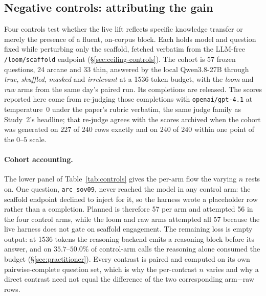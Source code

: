 \documentclass[10pt,twocolumn]{article}
\begin{document}
\subsection{Negative controls: attributing the gain}\label{sec:controls}
Four controls test whether the live lift reflects specific knowledge transfer or merely the presence of a fluent, on-corpus block. Each holds model and question fixed while perturbing only the scaffold, fetched verbatim from the LLM-free \texttt{/loom/scaffold} endpoint (\S\ref{sec:ceiling-controls}). The cohort is 57 frozen questions, 24 arcane and 33 thin, answered by the local Qwen3.8-27B through \emph{true}, \emph{shuffled}, \emph{masked} and \emph{irrelevant} at a 1536-token budget, with the \emph{loom} and \emph{raw} arms from the same day's paired run. Its completions are released. The scores reported here come from re-judging those completions with \texttt{openai/gpt-4.1} at temperature~0 under the paper's rubric verbatim, the same judge family as Study~2's headline; that re-judge agrees with the scores archived when the cohort was generated on $227$ of $240$ rows exactly and on $240$ of $240$ within one point of the $0$--$5$ scale.

\paragraph{Cohort accounting.} The lower panel of Table~\ref{tab:controls} gives the per-arm flow the varying $n$ rests on. One question, \texttt{arc\_sov09}, never reached the model in any control arm: the scaffold endpoint declined to inject for it, so the harness wrote a placeholder row rather than a completion. Planned is therefore 57 per arm and attempted 56 in the four control arms, while the loom and raw arms attempted all 57 because the live harness does not gate on scaffold engagement. The remaining loss is empty output: at 1536 tokens the reasoning backend emits a reasoning block before its answer, and on $35.7$--$50.0\%$ of control-arm calls the reasoning alone consumed the budget (\S\ref{sec:practitioner}). Every contrast is paired and computed on its own pairwise-complete question set, which is why the per-contrast $n$ varies and why a direct contrast need not equal the difference of the two corresponding arm$-$raw rows.
\end{document}

